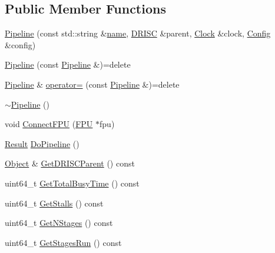 \subsection*{Public Member Functions}
\begin{DoxyCompactItemize}
\item 
\hyperlink{class_simulator_1_1drisc_1_1_pipeline_a007d966d68bf82350940a787aadb5351}{Pipeline} (const std\+::string \&\hyperlink{mtconf_8c_a8f8f80d37794cde9472343e4487ba3eb}{name}, \hyperlink{class_simulator_1_1_d_r_i_s_c}{D\+R\+I\+S\+C} \&parent, \hyperlink{class_simulator_1_1_clock}{Clock} \&clock, \hyperlink{class_config}{Config} \&config)
\item 
\hyperlink{class_simulator_1_1drisc_1_1_pipeline_a8f78a2335b3e93aa6a12ed3f3a661e12}{Pipeline} (const \hyperlink{class_simulator_1_1drisc_1_1_pipeline}{Pipeline} \&)=delete
\item 
\hyperlink{class_simulator_1_1drisc_1_1_pipeline}{Pipeline} \& \hyperlink{class_simulator_1_1drisc_1_1_pipeline_adbe94f3125321db796eea7ea960e209c}{operator=} (const \hyperlink{class_simulator_1_1drisc_1_1_pipeline}{Pipeline} \&)=delete
\item 
\hyperlink{class_simulator_1_1drisc_1_1_pipeline_a8d7774ca024866651bf485e3f7c713e0}{$\sim$\+Pipeline} ()
\item 
void \hyperlink{class_simulator_1_1drisc_1_1_pipeline_abef0fa17d5853df152deacdcd38ce1be}{Connect\+F\+P\+U} (\hyperlink{class_simulator_1_1_f_p_u}{F\+P\+U} $\ast$fpu)
\item 
\hyperlink{namespace_simulator_a4b6b5616e7236c0c131516a441776805}{Result} \hyperlink{class_simulator_1_1drisc_1_1_pipeline_a9ba3d40e233e7bc12490cb8da71b0aea}{Do\+Pipeline} ()
\item 
\hyperlink{class_simulator_1_1_object}{Object} \& \hyperlink{class_simulator_1_1drisc_1_1_pipeline_a3421cbb42460afcdea6ce2ecb48722c8}{Get\+D\+R\+I\+S\+C\+Parent} () const 
\item 
uint64\+\_\+t \hyperlink{class_simulator_1_1drisc_1_1_pipeline_ad07087499cdd1bd41d21f1e541efdd5c}{Get\+Total\+Busy\+Time} () const 
\item 
uint64\+\_\+t \hyperlink{class_simulator_1_1drisc_1_1_pipeline_a00dfcfc6a05eee988c05d7730caeb5f2}{Get\+Stalls} () const 
\item 
uint64\+\_\+t \hyperlink{class_simulator_1_1drisc_1_1_pipeline_a09919a6b3b09ac3992d20e34e4b2aaf8}{Get\+N\+Stages} () const 
\item 
uint64\+\_\+t \hyperlink{class_simulator_1_1drisc_1_1_pipeline_a089f1301fa977a5fe3713efe38dea5ad}{Get\+Stages\+Run} () const 

\end{DoxyCompactItemize}
